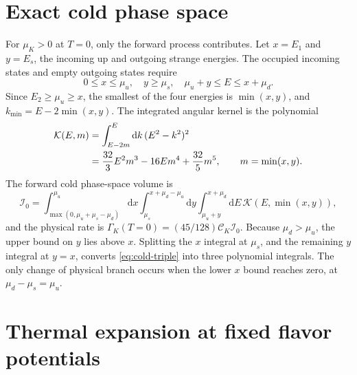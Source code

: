 \documentclass[11pt,letterpaper]{article}
\numberwithin{equation}{section}
\newcommand{\dd}{\mathrm d}
\newcommand{\CK}{\mathcal C_K}
\newcommand{\Izero}{\mathcal I_0}
\begin{document}
\section{Exact cold phase space}
\label{sec:cold}
For \(\mu_K>0\) at \(T=0\), only the forward process contributes.
Let \(x=E_1\) and \(y=E_s\), the incoming up and outgoing strange energies.
The occupied incoming states and empty outgoing states require
\begin{equation}
 0\leq x\leq\mu_u,\quad y\geq\mu_s,
 \quad \mu_u+y\leq E\leq x+\mu_d.
 \label{eq:cold-domain}
\end{equation}
Since \(E_2\geq\mu_u\geq x\), the smallest of the four energies is \(\min(x,y)\), and \(k_{\min}=E-2\min(x,y)\).
The integrated angular kernel is the polynomial
\begin{align}
 \mathcal K(E,m)
 &=\int_{E-2m}^E\dd k\,(E^2-k^2)^2\notag\\
 &=\frac{32}{3}E^2m^3-16Em^4+\frac{32}{5}m^5,
 \qquad m=\min(x,y).
 \label{eq:cold-kernel}
\end{align}
The forward cold phase-space volume is
\begin{equation}
 \Izero=\int_{\max(0,\mu_u+\mu_s-\mu_d)}^{\mu_u}\dd x
 \int_{\mu_s}^{x+\mu_d-\mu_u}\dd y
 \int_{\mu_u+y}^{x+\mu_d}\dd E\,
 \mathcal K(E,\min(x,y)),
 \label{eq:cold-triple}
\end{equation}
and the physical rate is \(\Gamma_K(T=0)=(45/128)\CK\Izero\).
Because \(\mu_d>\mu_u\), the upper bound on \(y\) lies above \(x\).
Splitting the \(x\) integral at \(\mu_s\), and the remaining \(y\) integral at \(y=x\), converts \cref{eq:cold-triple} into three polynomial integrals.
The only change of physical branch occurs when the lower \(x\) bound reaches zero, at \(\mu_d-\mu_s=\mu_u\).


\section{Thermal expansion at fixed flavor potentials}
\label{sec:sommerfeld}
\end{document}
